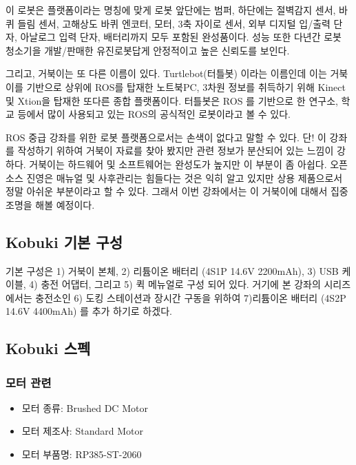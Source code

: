 이 로봇은 플랫폼이라는 명칭에 맞게 로봇 앞단에는 범퍼, 하단에는 절벽감지 센서, 바퀴 들림 센서, 고해상도 바퀴 엔코터, 모터, 3축 자이로 센서, 외부 디지털 입/출력 단자, 아날로그 입력 단자, 배터리까지 모두 포함된 완성품이다. 성능 또한 다년간 로봇 청소기을 개발/판매한 유진로봇답게 안정적이고 높은 신뢰도를 보인다. 

그리고, 거북이는 또 다른 이름이 있다. Turtlebot(터틀봇) 이라는 이름인데 이는 거북이를 기반으로 상위에 ROS를 탑재한 노트북PC, 3차원 정보를 취득하기 위해 Kinect 및 Xtion을 탑재한 또다른 종합 플랫폼이다. 터틀봇은 ROS 를 기반으로 한 연구소, 학교 등에서 많이 사용되고 있는 ROS의 공식적인 로봇이라고 볼 수 있다. 

ROS 중급 강좌를 위한 로봇 플랫폼으로서는 손색이 없다고 말할 수 있다. 단! 이 강좌를 작성하기 위하여 거북이 자료를 찾아 봤지만 관련 정보가 분산되어 있는 느낌이 강하다. 거북이는 하드웨어 및 소프트웨어는 완성도가 높지만 이 부분이 좀 아쉽다. 오픈소스 진영은 매뉴얼 및 사후관리는 힘들다는 것은 익히 알고 있지만 상용 제품으로서 정말 아쉬운 부분이라고 할 수 있다. 그래서 이번 강좌에서는 이 거북이에 대해서 집중 조명을 해볼 예정이다.

\subsection{Kobuki 기본 구성}

기본 구성은 1) 거북이 본체, 2) 리튬이온 배터리 (4S1P 14.6V 2200mAh), 3) USB 케이블, 4) 충전 어댑터, 그리고 5) 퀵 메뉴얼로 구성 되어 있다. 거기에 본 강좌의 시리즈에서는 충전소인 6) 도킹 스테이션과 장시간 구동을 위하여 7)리튬이온 배터리 (4S2P 14.6V 4400mAh) 를 추가 하기로 하겠다.

\subsection{Kobuki 스펙}

\subsubsection{모터 관련}

\begin{itemize}[leftmargin=*]
\item 모터 종류: Brushed DC Motor
\item 모터 제조사: Standard Motor
\item 모터 부품명: RP385-ST-2060
\end{itemize}

